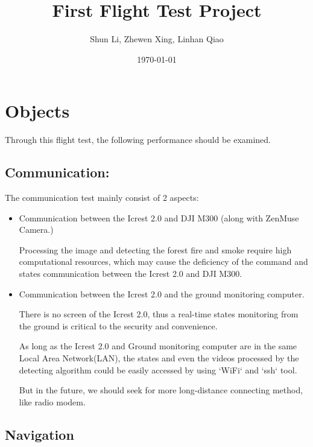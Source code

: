 \documentclass{report}
\title{First Flight Test Project}
\author{Shun Li, Zhewen Xing, Linhan Qiao }
\date{\today}
\begin{document}
\maketitle
\tableofcontents

\chapter{Objects}
Through this flight test, the following performance should be examined.

\section{Communication:}

The communication test mainly consist of 2 aspects:
\begin{itemize}
    \item Communication between the Icrest 2.0 and DJI M300 (along with
        ZenMuse Camera.)

        Processing the image and detecting the forest fire and smoke require
        high computational resources, which may cause the deficiency of the
        command and states communication between the Icrest 2.0 and DJI M300.

    \item Communication between the Icrest 2.0 and the ground monitoring
        computer.

        There is no screen of the Icrest 2.0, thus a real-time states
        monitoring from the ground is critical to the security and convenience.

        As long as the Icrest 2.0 and Ground
        monitoring computer are in the same Local Area Network(LAN), the states
        and even the videos processed by the detecting algorithm could be easily
        accessed by using `WiFi` and `ssh` tool.

        But in the future, we should seek for more long-distance connecting
        method, like radio modem.


\end{itemize}


\section{Navigation}
\end{document}
